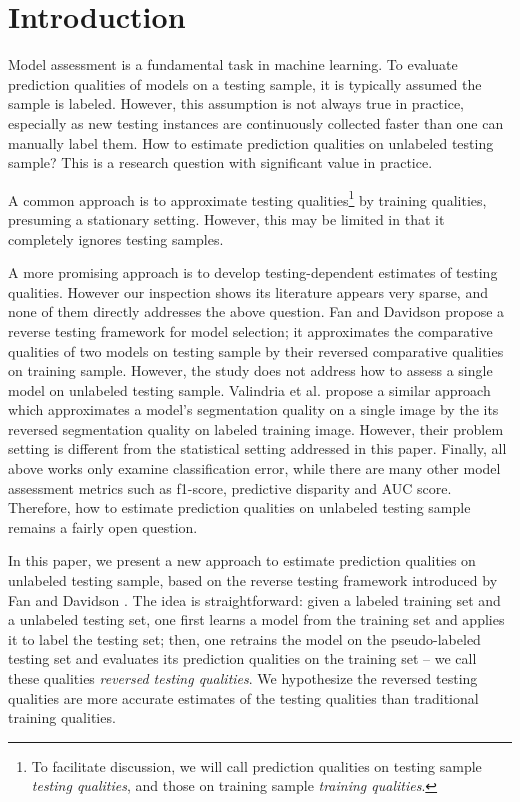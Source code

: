 \section{Introduction}

Model assessment is a fundamental task in machine learning. 
To evaluate prediction qualities of models on a testing sample, it is typically assumed the sample is labeled. 
However, this assumption is not always true in practice, 
especially as new testing instances are continuously collected 
faster than one can manually label them. How to estimate 
prediction qualities on unlabeled testing sample? This is 
a research question with significant value in practice. 

A common approach is to approximate testing qualities\footnote{To 
facilitate discussion, we will call 
prediction qualities on testing sample \textit{testing qualities}, 
and those on training sample \textit{training qualities}.} 
by training qualities, presuming a stationary setting. 
However, this may be limited in that it completely ignores 
testing samples. 

A more promising approach is to develop testing-dependent
estimates of testing qualities. However our inspection shows 
its literature appears very sparse, and none of them directly 
addresses the above question. 
Fan and Davidson \cite{fan2006reverse} propose a reverse testing 
framework for model selection; it approximates the comparative 
qualities of two models on testing sample by their reversed 
comparative qualities on training sample. However, the study does 
not address how to assess a single model on unlabeled testing sample. 
Valindria et al. \cite{valindria2017reverse} propose 
a similar approach which approximates a model's segmentation quality 
on a single image by the its reversed segmentation quality on labeled 
training image. However, their problem setting is different from 
the statistical setting addressed in this paper. 
Finally, all above works only examine classification error, while 
there are many other model assessment metrics such as f1-score, 
predictive disparity \cite{hardt2016equality} and AUC score. 
Therefore, how to estimate prediction qualities on unlabeled 
testing sample remains a fairly open question. 

In this paper, we present a new approach to estimate prediction 
qualities on unlabeled testing sample, based on the reverse testing framework introduced by Fan and Davidson \cite{fan2006reverse}. 
The idea is straightforward: 
given a labeled training set and a unlabeled testing set,
one first learns a model from the training set and applies it
to label the testing set; then, one retrains the model on the 
pseudo-labeled testing set and evaluates its prediction qualities 
on the training set -- we call these qualities \textit{reversed 
testing qualities}. 
We hypothesize the reversed testing qualities are more accurate 
estimates of the testing qualities than traditional training qualities.

